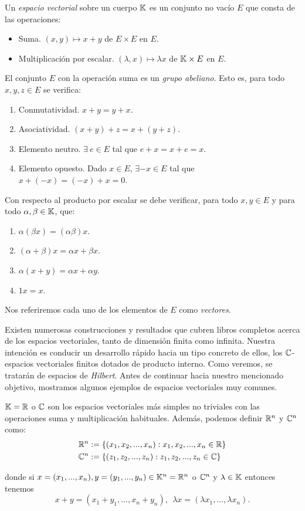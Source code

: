 \begin{definition} Un \textit{espacio vectorial} sobre un cuerpo $\mathbb{K}$ es un conjunto no vacío $E$ que consta de las operaciones:
\begin{itemize}
\item Suma. $(x,y)\mapsto x+y$ de $E\times E$ en $E$.
\item Multiplicación por escalar. $(\lambda,x)\mapsto \lambda x$ de $\mathbb{K}\times E$ en $E$.
\end{itemize}
El conjunto $E$ con la operación suma es un \textit{grupo abeliano}. Esto es, para todo $x,y,z\in E$ se verifica:
\begin{enumerate}[label=\alph*)]
\item Conmutatividad. $x + y = y + x$.
\item Asociatividad. $(x + y) + z = x + (y + z)$.
\item Elemento neutro. $\exists\ e\in E$ tal que $e+x=x+e=x$.
\item Elemento opuesto. Dado $x\in E$, $\exists -x\in E$ tal que $x+(-x)=(-x)+x=0$.
\end{enumerate}
Con respecto al producto por escalar se debe verificar, para todo $x,y\in E$ y para todo $\alpha,\beta\in\mathbb{K}$, que:
\begin{enumerate}[label=\alph*)]
\item $\alpha(\beta x)=(\alpha\beta)x$.
\item $(\alpha + \beta)x=\alpha x +\beta x$.
\item $\alpha (x + y) =\alpha x +\alpha y$.
\item $1x = x$.
\end{enumerate}
Nos referiremos cada uno de los elementos de $E$ como \textit{vectores}.
\end{definition}

Existen numerosas construcciones y resultados que cubren libros completos acerca de los espacios vectoriales, tanto de dimensión finita como infinita. Nuestra intención es conducir un desarrollo rápido hacia un tipo concreto de ellos, los $\mathbb{C}$-espacios vectoriales finitos dotados de producto interno. Como veremos, se tratarán de espacios de \textit{Hilbert}. Antes de continuar hacia nuestro mencionado objetivo, mostramos algunos ejemplos de espacios vectoriales muy comunes.

\begin{example} $\mathbb{K}=\mathbb{R}$ o $\mathbb{C}$ son los espacios vectoriales más simples no triviales con las operaciones suma y multiplicación habituales. Además, podemos definir $\mathbb{R}^n$ y $\mathbb{C}^n$ como:
%
\[
\begin{split}
&\mathbb{R}^n:=\{(x_1,x_2,...,x_n): x_1,x_2,...,x_n\in\mathbb{R}\} \\
&\mathbb{C}^n:=\{(z_1,z_2,...,z_n): z_1,z_2,...,z_n\in\mathbb{C}\}
\end{split}
\]%

\noindent donde si $x=(x_1,...,x_n),y=(y_1,...,y_n)\in\mathbb{K}^n=\mathbb{R}^n$ o $\mathbb{C}^n$ y $\lambda\in\mathbb{K}$ entonces tenemos
\[x+y=(x_1+y_1,...,x_n+y_n),\ \ \lambda x=(\lambda x_1,...,\lambda x_n).\]
\end{example}


